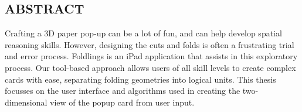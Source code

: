 \pagestyle{plain}
\begin{center}


\section*{ABSTRACT}


\end{center}
Crafting a 3D paper pop-up can be a lot of fun, and can help develop spatial reasoning skills.  However, designing the cuts and folds is often a frustrating trial and error process.  Foldlings is an iPad application that assists in this exploratory process.   Our tool-based approach allows users of all skill levels to create complex cards with ease, separating folding geometries into logical units.  This thesis focusses on the user interface and algorithms used in creating the two-dimensional view of the popup card from user input.

\cleardoublepage
